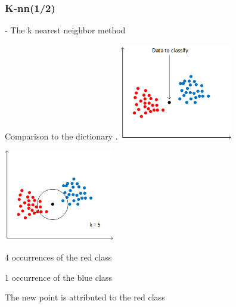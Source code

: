 \documentclass[xcolor=table]{beamer}
\begin{document}
\begin{frame}\frametitle{K-nn(1/2)}


- The k nearest neighbor method

\begin{itemize}
\item<1-> Comparison to the dictionary .
 {\includegraphics[height=4.2cm]{knnwc.png}} %
 {\includegraphics[height=4cm]{knnac.png}
\item 4 occurrences of {the \color{red} red} class
\item 1 occurrence of {the \color{blue} blue} class
\item The new point is attributed to {the \color{red} red} class}
\end{itemize}

\end{frame}
\end{document}

